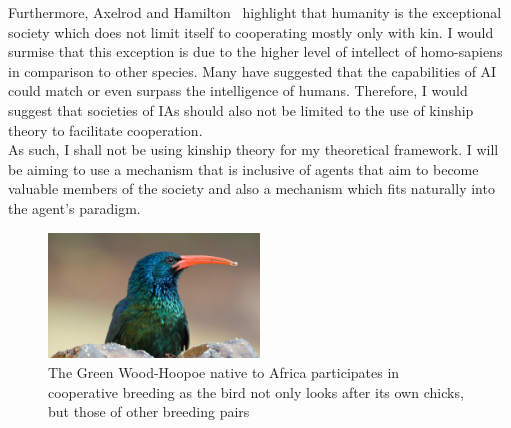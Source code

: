\documentclass[]{final_report}
\begin{document}
Furthermore, Axelrod and Hamilton~\cite{evolution_of_cooperation} highlight that humanity is the exceptional society which does not limit itself to cooperating mostly only with kin. I would surmise that this exception is due to the higher level of intellect of homo-sapiens in comparison to other species. Many have suggested that the capabilities of AI could match or even surpass the intelligence of humans. Therefore, I would suggest that societies of IAs should also not be limited to the use of kinship theory to facilitate cooperation.\\
As such, I shall not be using kinship theory for my theoretical framework. I will be aiming to use a  mechanism that is inclusive of agents that aim to become valuable members of the society and also a mechanism which fits naturally into the agent's paradigm. 
\begin{figure}
	\center
	\includegraphics[width=0.5\textwidth]{green-wood-hoopoe.jpg}
	\caption{The Green Wood-Hoopoe native to Africa participates in cooperative breeding as the bird not only looks after its own chicks, but those of other breeding pairs~\cite{hoopoe}}
	\label{fig:hoopoe}
\end{figure}
\end{document}
